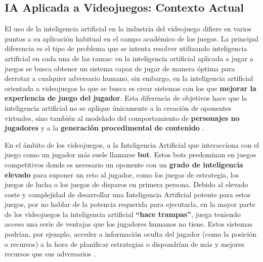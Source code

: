 \subsection{IA Aplicada a Videojuegos: Contexto Actual}
El uso de la inteligencia artificial en la industria del videojuego difiere en varios puntos a su aplicación habitual en el campo académico de los juegos. La principal diferencia es el tipo de problema que se intenta resolver utilizando inteligencia artificial en cada una de las ramas: en la inteligencia artificial aplicada a jugar a juegos se busca obtener un sistema capaz de jugar de manera óptima para derrotar a cualquier adversario humano, sin embargo, en la inteligencia artificial orientada a videojuegos lo que se busca es crear sistemas con los que \textbf{mejorar la experiencia de juego del jugador}. Esta diferencia de objetivos hace que la inteligencia artificial no se aplique únicamente a la creación de oponentes virtuales, sino también al modelado del comportamiento de \textbf{personajes no jugadores} y a la \textbf{generación procedimental de contenido} \cite{ai_and_games}.

En el ámbito de los videojuegos, a la Inteligencia Artificial que interacciona con el juego como un jugador más suele llamarse \textbf{bot}. Estos bots predominan en juegos competitivos donde es necesario un oponente con un \textbf{grado de inteligencia elevado} para suponer un reto al jugador, como los juegos de estrategia, los juegos de lucha o los juegos de disparos en primera persona. Debido al elevado coste y complejidad de desarrollar una Inteligencia Artificial potente para estos juegos, por no hablar de la potencia requerida para ejecutarla, en la mayor parte de los videojuegos la inteligencia artificial \textbf{``hace trampas''}, juega teniendo acceso una serie de ventajas que los jugadores humanos no tiene. Estos sistemas podrían, por ejemplo, acceder a información oculta del jugador (como la posición o recursos) a la hora de planificar estrategias o dispondrían de más y mejores recursos que sus adversarios \cite{ai_and_games}.


